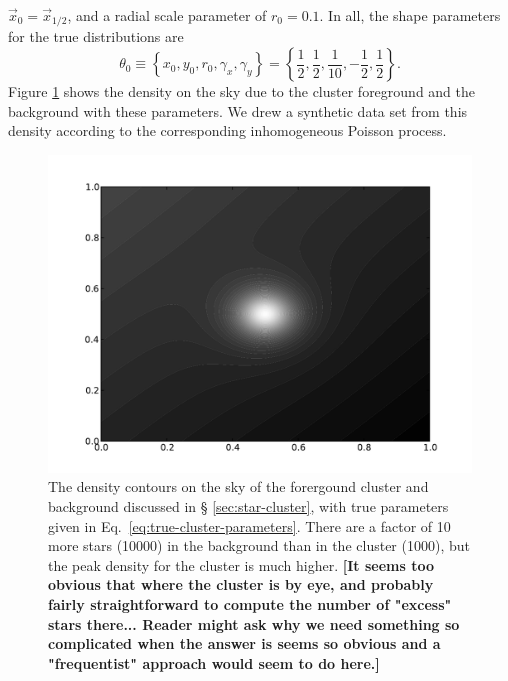 \documentclass[aps,prd]{revtex4-1}
\newcommand{\ilya}[1]{{\color{red} \bf #1}}
\begin{document}
$\vec{x}_0 = \vec{x}_{1/2}$, and a radial scale parameter of $r_0 =
0.1$.  In all, the shape parameters for the true distributions are
\begin{equation}
\label{eq:true-cluster-parameters}
\theta_0 \equiv \left\{ x_0, y_0, r_0, \gamma_x, \gamma_y \right\} =
\left\{ \frac{1}{2}, \frac{1}{2}, \frac{1}{10}, -\frac{1}{2},
  \frac{1}{2} \right\}.
\end{equation}
Figure \ref{fig:sky-density} shows the density on the sky due to the
cluster foreground and the background with these parameters.  We drew
a synthetic data set from this density according to the corresponding
inhomogeneous Poisson process.

\begin{figure}
  \includegraphics[width=\columnwidth]{sky-density}
  \caption{\label{fig:sky-density} The density contours on the sky of
    the forergound cluster and background discussed in \S
    \ref{sec:star-cluster}, with true parameters given in
    Eq.~\eqref{eq:true-cluster-parameters}.  There are a factor of 10
    more stars (10000) in the background than in the cluster (1000),
    but the peak density for the cluster is much higher.  \ilya{[It
        seems too obvious that where the cluster is by eye, and
        probably fairly straightforward to compute the number of
        "excess" stars there...  Reader might ask why we need
        something so complicated when the answer is seems so obvious
        and a "frequentist" approach would seem to do here.]}}
\end{figure}
\end{document}
